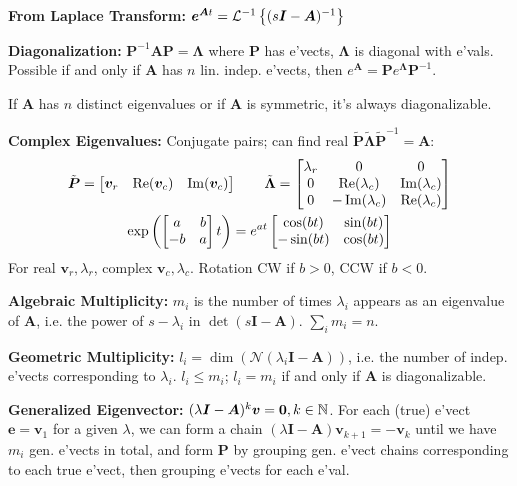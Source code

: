 \documentclass[twocolumn, 8pt]{extarticle}
\begin{document}
\textbf{From Laplace Transform:} \(\bm e^{\bm At} = \mathcal{L}^{-1}\left\{ (s\bm I - \bm A)^{-1} \right\}\)

\textbf{Diagonalization:} \(\bm P^{-1}\bm A\bm P = \bm\Lambda\) where \(\bm P\) has e'vects, \(\bm\Lambda\) is diagonal
with e'vals. Possible if and only if \(\bm A\) has \(n\) lin. indep. e'vects, then \(e^{\bm A} = \bm Pe^{\bm\Lambda}\bm P^{-1}\).

If \(\bm A\) has \(n\) distinct eigenvalues or if \(\bm A\) is symmetric, it's always diagonalizable.

\textbf{Complex Eigenvalues:} Conjugate pairs; can find real \(\tilde{\bm P}\tilde{\bm\Lambda}\tilde{\bm P}^{-1} = \bm A\):
\begin{gather*}
    \tilde{\bm P} = \rvec{\bm v_r}{\Re(\bm v_c)}{\Im(\bm v_c)} \qquad
    \tilde{\bm\Lambda} = \matthree{\lambda _r}{0}{0}{0}{\Re(\lambda _c)}{\Im(\lambda _c)}{0}{-\Im(\lambda _c)}{\Re(\lambda _c)} \\
    \exp\left(\mattwo{a}{b}{-b}{a}t\right) = e^{at}\mattwo{\cos(bt)}{\sin(bt)}{-\sin(bt)}{\cos(bt)}
\end{gather*}
For real \(\bm v_r, \lambda _r\), complex \(\bm v_c, \lambda _c\).
Rotation CW if \(b > 0\), CCW if \(b < 0\).

\textbf{Algebraic Multiplicity:} \(m_i\) is the number of times \(\lambda _i\) appears as an eigenvalue of \(\bm A\),
i.e. the power of \(s - \lambda _i\) in \(\det(s\bm I - \bm A)\). \(\sum _i m_i = n\).

\textbf{Geometric Multiplicity:} \(l_i = \dim(\mathcal N(\lambda _i\bm I - \bm A))\), i.e. the number of indep.
e'vects corresponding to \(\lambda _i\). \(l_i \leq m_i\); \(l_i = m_i\) if and only if \(\bm A\) is diagonalizable.

\textbf{Generalized Eigenvector:} \((\lambda\bm I - \bm A)^k\bm v = \bm 0, k \in \mathbb{N}\). For each (true) e'vect
\(\bm e = \bm v_1\) for a given \(\lambda\), we can form a chain \((\lambda\bm I - \bm A)\bm v_{k + 1} = -\bm v_k\)
until we have \(m_i\) gen. e'vects in total, and form \(\bm P\) by grouping gen. e'vect chains corresponding to each
true e'vect, then grouping e'vects for each e'val.
\end{document}

